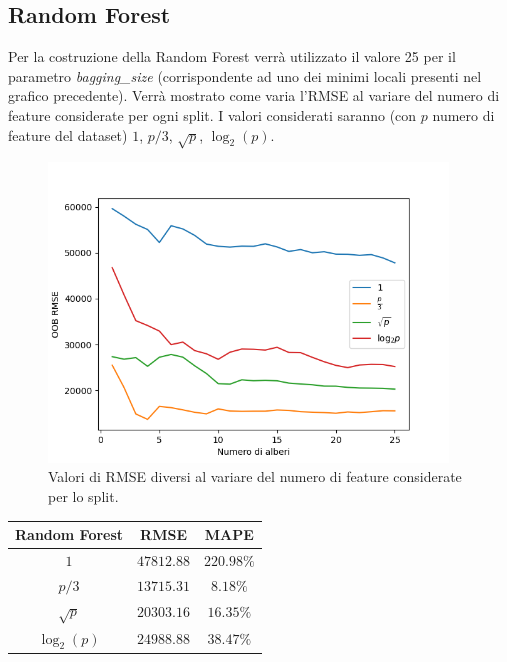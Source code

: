 \documentclass{article}
\begin{document}
    
    \subsection{Random Forest}
    Per la costruzione della Random Forest verrà utilizzato il valore 25
    per il parametro \textit{bagging\_size} (corrispondente ad uno dei minimi
    locali presenti nel grafico precedente).
    Verrà mostrato come varia l'RMSE al variare del numero di feature 
    considerate per ogni split. I valori considerati saranno (con $p$ numero di feature
    del dataset) $1$, $p/3$, $\sqrt{p}$, $\log_2{(p)}$.

    \begin{figure}[h]
        \caption{Valori di RMSE diversi al variare del numero
        di feature considerate per lo split.
        }
        \includegraphics[width=10.6cm]{random}
        \centering
    \end{figure} 


    \begin{center}
        \begin{tabular}{|c|c|c|}
            \hline
            \textbf{Random Forest} & \textbf{RMSE} & \textbf{MAPE} \\
            \hline
            $1$ & $47812.88$ &  $220.98\%$ \\
            $p/3$ & $13715.31$ &  $8.18\%$ \\
            $\sqrt{p}$ & $20303.16$ &  $16.35\%$ \\
            $\log_2{(p)}$ & $24988.88$ &  $38.47\%$ \\
            \hline
        \end{tabular}
    \end{center}
\end{document}
